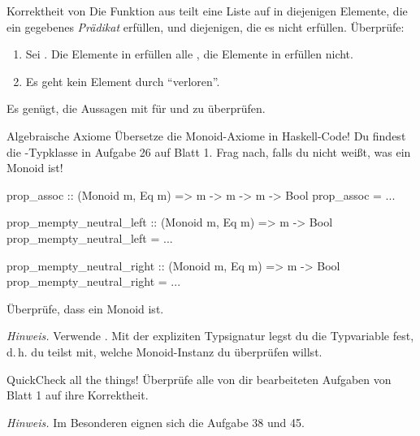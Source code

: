 \documentclass{uebblatt}
\newcommand{\refaufgabe}[1]{#1} %
\begin{document}
\begin{aufgabe}{Korrektheit von }
  Die Funktion  aus
   teilt eine Liste auf in diejenigen Elemente, die ein
  gegebenes \emph{Prädikat}  erfüllen, und
  diejenigen, die es nicht erfüllen. Überprüfe:
  
  \begin{enumerate}
    \item Sei . Die Elemente in  erfüllen alle , die Elemente in  erfüllen  nicht.
    \item Es geht kein Element durch  "`verloren"'.
  \end{enumerate}

  {\scriptsize Es genügt, die Aussagen mit  für
   und  zu überprüfen.}
\end{aufgabe}

\begin{aufgabe}{Algebraische Axiome}
  Übersetze die Monoid-Axiome in Haskell-Code! Du findest die
  -Typklasse in Aufgabe \refaufgabe{26} auf Blatt 1. Frag
  nach, falls du nicht weißt, was ein Monoid ist!
  
\begin{haskellcode}
prop_assoc :: (Monoid m, Eq m) => m -> m -> m -> Bool
prop_assoc = ...

prop_mempty_neutral_left :: (Monoid m, Eq m) => m -> Bool
prop_mempty_neutral_left = ...

prop_mempty_neutral_right :: (Monoid m, Eq m) => m -> Bool
prop_mempty_neutral_right = ...
\end{haskellcode}
  Überprüfe, dass \haskellinline{[Char]} ein Monoid ist.

  {\scriptsize \emph{Hinweis.} Verwende
  . Mit der expliziten Typsignatur legst du die
  Typvariable  fest, d.\,h. du teilst
  mit, welche Monoid-Instanz du überprüfen willst.}
\end{aufgabe}

\begin{aufgabe}{QuickCheck all the things!}
  Überprüfe alle von dir bearbeiteten Aufgaben von Blatt 1 auf ihre Korrektheit.
  
  {\scriptsize \emph{Hinweis.} Im Besonderen eignen sich die Aufgabe \refaufgabe{38} und \refaufgabe{45}.}
\end{aufgabe}
\end{document}
